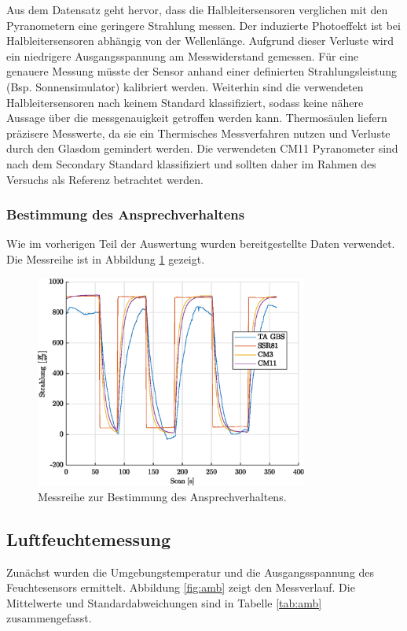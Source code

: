 Aus dem Datensatz geht hervor, dass die Halbleitersensoren verglichen mit den Pyranometern eine geringere Strahlung messen. Der induzierte Photoeffekt ist bei Halbleitersensoren abhängig von der Wellenlänge. Aufgrund dieser Verluste wird ein niedrigere Ausgangsspannung am Messwiderstand gemessen. Für eine genauere Messung müsste der Sensor anhand einer definierten Strahlungsleistung (Bsp. Sonnensimulator) kalibriert werden. Weiterhin sind die verwendeten Halbleitersensoren nach keinem Standard klassifiziert, sodass keine nähere Aussage über die messgenauigkeit getroffen werden kann. Thermosäulen liefern präzisere Messwerte, da sie ein Thermisches Messverfahren nutzen und Verluste durch den Glasdom gemindert werden. Die verwendeten CM11 Pyranometer sind nach dem Secondary Standard klassifiziert und sollten daher im Rahmen des Versuchs als Referenz betrachtet werden.


\subsubsection{Bestimmung des Ansprechverhaltens}
Wie im vorherigen Teil der Auswertung wurden bereitgestellte Daten verwendet. Die Messreihe ist in Abbildung \ref{fig:response} gezeigt.
\begin{figure}[H]
	\centering
	\includegraphics[width=0.8\textwidth]{../DATA/Messreihe_Ansprechzeit.eps}
	\caption[Messreihe zur Bestimmung des Ansprechverhaltens.]{Messreihe zur Bestimmung des Ansprechverhaltens.}
	\label{fig:response}
\end{figure}

\subsection{Luftfeuchtemessung}
Zunächst wurden die Umgebungstemperatur und die Ausgangsspannung des Feuchtesensors ermittelt. Abbildung \ref{fig:amb} zeigt den Messverlauf. Die Mittelwerte und Standardabweichungen sind in Tabelle \ref{tab:amb} zusammengefasst.


